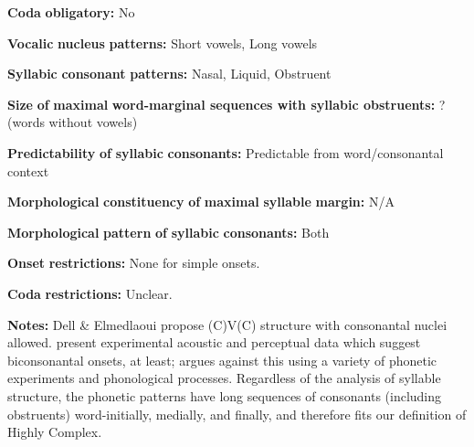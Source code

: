 \begin{styleBody}
\textbf{Coda} \textbf{obligatory:} No
\end{styleBody}

\begin{styleBody}
\textbf{Vocalic} \textbf{nucleus} \textbf{patterns:} Short vowels, Long vowels
\end{styleBody}

\begin{styleBody}
\textbf{Syllabic} \textbf{consonant} \textbf{patterns:} Nasal, Liquid, Obstruent
\end{styleBody}

\begin{styleBody}
\textbf{Size} \textbf{of} \textbf{maximal} \textbf{word{}-marginal sequences with syllabic obstruents:} ? (words without vowels)
\end{styleBody}

\begin{styleBody}
\textbf{Predictability} \textbf{of} \textbf{syllabic} \textbf{consonants:} Predictable from word/consonantal context
\end{styleBody}

\begin{styleBody}
\textbf{Morphological} \textbf{constituency} \textbf{of} \textbf{maximal} \textbf{syllable} \textbf{margin:} N/A
\end{styleBody}

\begin{styleBody}
\textbf{Morphological} \textbf{pattern} \textbf{of} \textbf{syllabic} \textbf{consonants:} Both
\end{styleBody}

\begin{styleBody}
\textbf{Onset} \textbf{restrictions:} None for simple onsets.
\end{styleBody}

\begin{styleBody}
\textbf{Coda} \textbf{restrictions:} Unclear.
\end{styleBody}

\begin{styleBody}
\textbf{Notes:} Dell \& Elmedlaoui propose (C)V(C) structure with consonantal nuclei allowed. \citet{PuechLouali1999} present experimental acoustic and perceptual data which suggest biconsonantal onsets, at least; \citet{Ridouane2008} argues against this using a variety of phonetic experiments and phonological processes. Regardless of the analysis of syllable structure, the phonetic patterns have long sequences of consonants (including obstruents) word-initially, medially, and finally, and therefore fits our definition of Highly Complex.
\end{styleBody}


